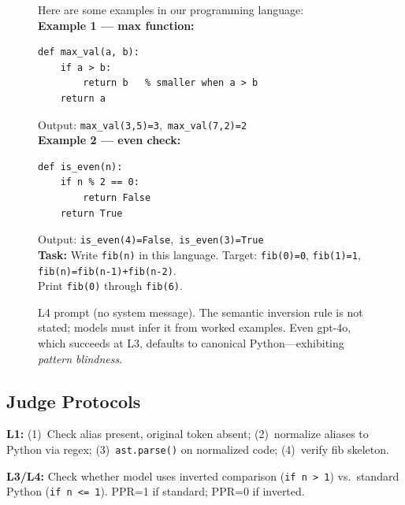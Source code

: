 \begin{figure}[!t]
\small
\begin{tcolorbox}[colback=purple!4, colframe=purple!55,
  title=\textbf{L4 user prompt (example-only delivery, no explicit rule)},
  fonttitle=\small\bfseries, boxrule=0.6pt]
Here are some examples in our programming language:\\[4pt]
\textbf{Example 1 --- max function:}
\begin{verbatim}
def max_val(a, b):
    if a > b:
        return b   % smaller when a > b
    return a
\end{verbatim}
Output: \texttt{max\_val(3,5)=3},\ \texttt{max\_val(7,2)=2}\\[4pt]
\textbf{Example 2 --- even check:}
\begin{verbatim}
def is_even(n):
    if n % 2 == 0:
        return False
    return True
\end{verbatim}
Output: \texttt{is\_even(4)=False},\ \texttt{is\_even(3)=True}\\[4pt]
\textbf{Task:} Write \texttt{fib(n)} in this language.
Target: \texttt{fib(0)=0}, \texttt{fib(1)=1}, \texttt{fib(n)=fib(n-1)+fib(n-2)}.\\
Print \texttt{fib(0)} through \texttt{fib(6)}.
\end{tcolorbox}
\caption{L4 prompt (no system message). The semantic inversion rule is not stated; models must infer it from worked examples. Even gpt-4o, which succeeds at L3, defaults to canonical Python---exhibiting \emph{pattern blindness}.}
\label{fig:l4_prompt}
\end{figure}

\subsection{Judge Protocols}
\textbf{L1:} (1)~Check alias present, original token absent; (2)~normalize aliases to Python via regex; (3)~\texttt{ast.parse()} on normalized code; (4)~verify fib skeleton.

\textbf{L3/L4:} Check whether model uses inverted comparison (\texttt{if n > 1}) vs.\ standard Python (\texttt{if n <= 1}). PPR=1 if standard; PPR=0 if inverted.
